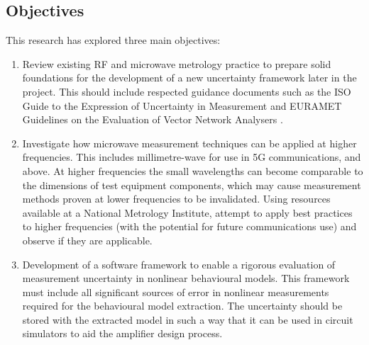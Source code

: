 \documentclass[../thesis/thesis.tex]{subfiles}
\begin{document}
\begin{refsection}
\section{Objectives}
This research has explored three main objectives:
\begin{enumerate}
	\item Review existing RF and microwave metrology practice to prepare solid foundations for the development of a new uncertainty framework later in the project. This should include respected guidance documents such as the ISO Guide to the Expression of Uncertainty in Measurement \cite{GUM_2008} and EURAMET Guidelines on the Evaluation of Vector Network Analysers \cite{EURAMET_2011}.
	\item Investigate how microwave measurement techniques can be applied at higher frequencies. This includes millimetre-wave for use in 5G communications, and above. At higher frequencies the small wavelengths can become comparable to the dimensions of test equipment components, which may cause measurement methods proven at lower frequencies to be invalidated. Using resources available at a National Metrology Institute, attempt to apply best practices to higher frequencies (with the potential for future communications use) and observe if they are applicable.
	\item Development of a software framework to enable a rigorous evaluation of measurement uncertainty in nonlinear behavioural models. This framework must include all significant sources of error in nonlinear measurements required for the behavioural model extraction. The uncertainty should be stored with the extracted model in such a way that it can be used in circuit simulators to aid 
	the amplifier design process.
\end{enumerate}

\end{refsection}
\end{document}
